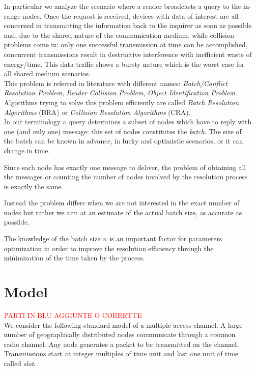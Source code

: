 \documentclass[12pt,a4paper]{report}
\newcommand{\rev}[1]{\textcolor{Cerulean}{#1}}
\begin{document}
In particular we analyze the scenario where a reader broadcasts a query to the in-range nodes. Once the request is received, devices with data of interest are all concerned in transmitting the information back to the inquirer as soon as possible and, due to the shared nature of the communication medium,  while collision problems come in: only one successful transmission at time can be accomplished, concurrent transmissions result in destructive interference with inefficient waste of energy/time. This data traffic shows a bursty nature which is the worst case for all shared medium scenarios.\\

This problem is referred in literature with different names: \emph{Batch/Conflict Resolution Problem}, \emph{Reader Collision Problem}, \emph{Object Identification Problem}.\\
Algorithms trying to solve this problem efficiently  are called \emph{Batch Resolution Algorithms} (BRA) or  \emph{Collision Resolution Algorithms} (CRA).\\ 

In our terminology a query determines a subset of nodes which have to reply with one (and only one) message: this set of nodes constitutes the \emph{batch}. The size of the batch can be known in advance, in lucky and optimistic scenarios, or \rev{it} can change in time.

Since each node has exactly one message to deliver, the problem of obtaining all the messages or counting the number of nodes involved by the resolution process is exactly the same.

\rev{
Instead the problem differs when we are not interested in the exact number of nodes but rather we aim at an estimate of the actual batch size, as accurate as possible.}

\rev{
The knowledge of the batch size $n$ is an important factor for parameters optimization in order to improve the resolution efficiency  through the minimization of the time taken by the process.\\}

\section{Model}
\label{se:model}
\textcolor{red}{PARTI IN BLU AGGIUNTE O CORRETTE}\\

We consider the following standard model of a multiple access channel. A large number of geographically distributed nodes communicate through a common radio channel. Any node generates a packet to be transmitted on the channel. Transmissions start at integer multiples of  time unit and last one unit of time called \emph{slot}.\\
\end{document}
